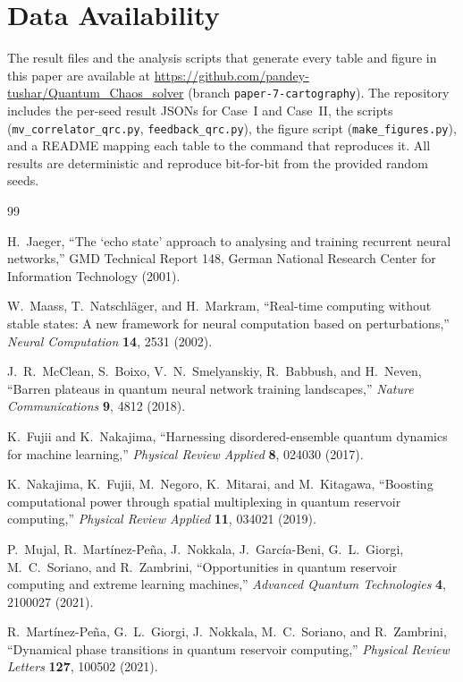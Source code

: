\documentclass[11pt,a4paper]{article}
\begin{document}
\section*{Data Availability}

The result files and the analysis scripts that generate every table and figure in
this paper are available at
\url{https://github.com/pandey-tushar/Quantum_Chaos_solver} (branch
\texttt{paper-7-cartography}). The repository includes the per-seed result JSONs
for Case~I and Case~II, the scripts (\texttt{mv\_correlator\_qrc.py},
\texttt{feedback\_qrc.py}), the figure script (\texttt{make\_figures.py}), and a
README mapping each table to the command that reproduces it. All results are
deterministic and reproduce bit-for-bit from the provided random seeds.

\begin{thebibliography}{99}

 H.~Jaeger, ``The `echo state' approach to analysing and
training recurrent neural networks,'' GMD Technical Report 148, German National
Research Center for Information Technology (2001).

 W.~Maass, T.~Natschl\"ager, and H.~Markram, ``Real-time
computing without stable states: A new framework for neural computation based on
perturbations,'' \emph{Neural Computation} \textbf{14}, 2531 (2002).

 J.~R.~McClean, S.~Boixo, V.~N.~Smelyanskiy, R.~Babbush,
and H.~Neven, ``Barren plateaus in quantum neural network training landscapes,''
\emph{Nature Communications} \textbf{9}, 4812 (2018).

 K.~Fujii and K.~Nakajima, ``Harnessing disordered-ensemble
quantum dynamics for machine learning,'' \emph{Physical Review Applied}
\textbf{8}, 024030 (2017).

 K.~Nakajima, K.~Fujii, M.~Negoro, K.~Mitarai, and
M.~Kitagawa, ``Boosting computational power through spatial multiplexing in
quantum reservoir computing,'' \emph{Physical Review Applied} \textbf{11},
034021 (2019).

 P.~Mujal, R.~Mart\'inez-Pe\~na, J.~Nokkala, J.~Garc\'ia-Beni,
G.~L.~Giorgi, M.~C.~Soriano, and R.~Zambrini, ``Opportunities in quantum
reservoir computing and extreme learning machines,'' \emph{Advanced Quantum
Technologies} \textbf{4}, 2100027 (2021).

 R.~Mart\'inez-Pe\~na, G.~L.~Giorgi, J.~Nokkala,
M.~C.~Soriano, and R.~Zambrini, ``Dynamical phase transitions in quantum
reservoir computing,'' \emph{Physical Review Letters} \textbf{127}, 100502
(2021).


\end{thebibliography}
\end{document}
